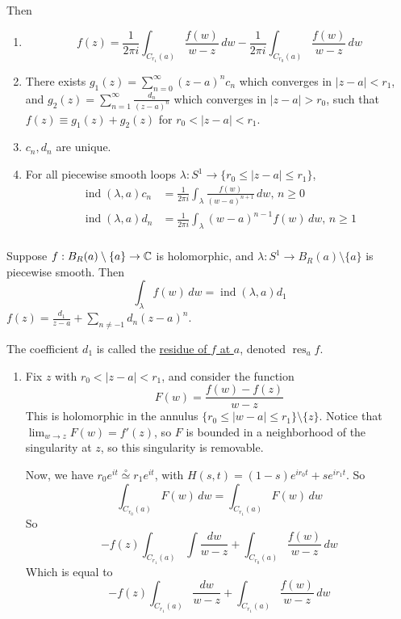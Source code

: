 \documentclass[x11names,reqno,14pt]{extarticle}
\newcommand{\oo}{{\infty}}
\DeclareMathOperator{\ind}{ind}
\DeclareMathOperator{\res}{res}
\begin{document}
Then
\begin{enumerate}[label=(\roman*)]
\item 
\[
f(z) = \frac{1}{2\pi i}\int_{C_{r_1}(a)}\frac{f(w)}{w - z}\,dw - \frac{1}{2\pi i}\int_{C_{r_0}(a)}\frac{f(w)}{w - z}\,dw
\] 
\item There exists $g_1(z) = \sum_{n=0}^\oo (z - a)^nc_n$ which converges in $|z - a| < r_1$, and $g_2(z) = \sum_{n=1}^\oo\frac{d_n}{(z - a)^n}$ which converges in $|z - a| > r_0$, such that $f(z) \equiv g_1(z) + g_2(z)$ for $r_0 < |z - a| < r_1$. 
\item $c_n, d_n$ are unique. 
\item For all piecewise smooth loops $\lambda:S^1\to\{r_0\leq|z - a|\leq r_1\}$, 
\begin{align*}
\ind(\lambda, a)c_n & = \frac{1}{2\pi i}\int_{\lambda}\frac{f(w)}{(w - a)^{n + 1}}\, dw,\, n \geq 0 \\
\ind(\lambda, a)d_n & = \frac{1}{2\pi i}\int_{\lambda}(w - a)^{n - 1}f(w)\,dw,\, n \geq 1 \\
\end{align*}
\end{enumerate}

\cor

Suppose $f:B_R(a)\setminus\{a\}\to\mathbb{C}$ is holomorphic, and $\lambda:S^1\to B_R(a)\setminus\{a\}$ is piecewise smooth. Then
\[
\int_{\lambda}f(w)\,dw = \ind(\lambda, a)d_1
\]
$f(z) = \frac{d_1}{z - a} + \sum_{n\neq -1}d_n(z - a)^n$. 

The coefficient $d_1$ is called the \underline{residue of $f$ at $a$}, denoted $\res_a f$. 

\proof

\begin{enumerate}[label=(\roman*)]
\item Fix $z$ with $r_0 < |z - a| < r_1$, and consider the function
\[
F(w) = \frac{f(w) - f(z)}{w - z}
\]
This is holomorphic in the annulus $\{r_0 \leq |w - a| \leq r_1 \}\setminus\{z\}$. Notice that $\lim_{w\to z}F(w) = f'(z)$, so $F$ is bounded in a neighborhood of the singularity at $z$, so this singularity is removable. 

Now, we have $r_0e^{it} \overset{\circ}{\simeq} r_1e^{it}$, with $H(s, t) = (1 - s)e^{ir_0t} + se^{ir_1t}$. So
\[
\int_{C_{r_0}(a)}F(w)\,dw = \int_{C_{r_1}(a)}F(w)\,dw
\]
So
\[
-f(z)\int_{C_{r_1}(a)}\int\frac{dw}{w - z} + \int_{C_{r_0}(a)}\frac{f(w)}{w - z}\,dw
\]
Which is equal to 
\[
-f(z)\int_{C_{r_1}(a)}\frac{dw}{w - z} + \int_{C_{r_1}(a)}\frac{f(w)}{w - z}\,dw
\]
\end{enumerate}
\end{document}
